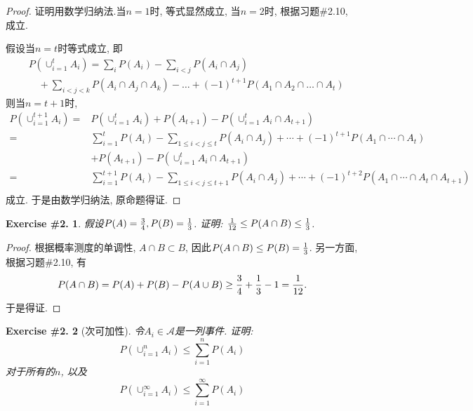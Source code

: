 \documentclass[UTF8, a4paper]{article}
\newtheorem{exercise}{Exercise \#2.}
\begin{document}
\begin{proof}
证明用数学归纳法.当\(n=1\)时, 等式显然成立, 当\(n = 2\)时, 根据习题\#2.10, 成立.

假设当\(n = t\)时等式成立, 即
$$
\begin{aligned}
& P\left(\cup_{i=1}^t A_i\right)=\sum_i P\left(A_i\right)-\sum_{i<j} P\left(A_i \cap A_j\right) \\
& \quad+\sum_{i<j<k} P\left(A_i \cap A_j \cap A_k\right)-\ldots+(-1)^{t+1} P\left(A_1 \cap A_2 \cap \ldots \cap A_t\right)
\end{aligned}
$$
则当\(n = t+1\)时, 
$$
\begin{aligned}
    P(\cup_{i=1}^{t+1} A_i) =& P(\cup_{i=1}^t A_i) + P(A_{t+1}) - P(\cup_{i=1}^t A_i \cap A_{t+1})\\
    =& \sum_{i=1}^t P(A_i) - \sum_{1\leq i<j \leq t} P(A_i \cap A_j) + \cdots + (-1)^{t+1} P(A_1 \cap \cdots \cap A_t) \\ &+ P(A_{t+1}) - P(\cup_{i=1}^t A_i \cap A_{t+1})\\
    =& \sum_{i=1}^{t+1} P(A_i) - \sum_{1 \leq i<j \leq t+1} P(A_i \cap A_j) + \cdots + (-1)^{t+2} P(A_1 \cap \cdots \cap A_t \cap A_{t+1})\\
\end{aligned}
$$
成立. 于是由数学归纳法, 原命题得证.
\end{proof}


\begin{framed}
\begin{exercise}
    假设\(P(A) = {3\over 4}, P(B) = {1 \over 3}\). 证明: \({1 \over 12} \leq P(A \cap B) \leq {1 \over 3}\).
\end{exercise}
\end{framed}

\begin{proof}
根据概率测度的单调性, \(A\cap B \subset B\), 因此\(P(A\cap B) \leq P(B) = {1 \over 3}\).
另一方面, 根据习题\#2.10, 有
$$
P(A\cap B) = P(A) + P(B) - P(A\cup B) \geq {3\over 4} + {1\over 3} - 1 = {1\over 12}.
$$
于是得证.
\end{proof}

\begin{framed}
\begin{exercise}[次可加性]
    令\(A_i \in \mathcal{A}\)是一列事件. 证明:
    $$
P\left(\cup_{i=1}^n A_i\right) \leq \sum_{i=1}^n P\left(A_i\right)
$$
对于所有的\(n\), 以及 
$$
P\left(\cup_{i=1}^{\infty} A_i\right) \leq \sum_{i=1}^{\infty} P\left(A_i\right)
$$
\end{exercise}
\end{framed}
\end{document}
